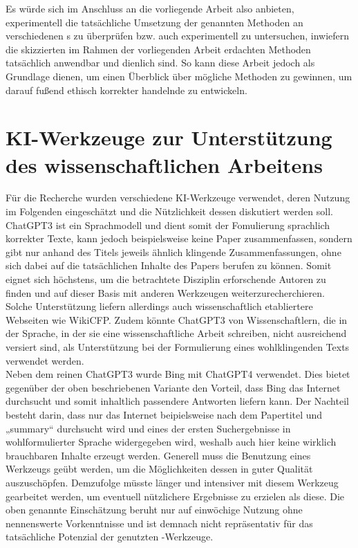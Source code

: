 \documentclass[hidelinks,12pt]{report}
\begin{document}
Es würde sich im Anschluss an die vorliegende Arbeit also anbieten, experimentell die tatsächliche Umsetzung der genannten Methoden an verschiedenen s zu überprüfen bzw. auch experimentell zu untersuchen, inwiefern die skizzierten im Rahmen der vorliegenden Arbeit erdachten Methoden tatsächlich anwendbar und dienlich sind.
So kann diese Arbeit jedoch als Grundlage dienen, um einen Überblick über mögliche Methoden zu gewinnen, um darauf fußend ethisch korrekter handelnde  zu entwickeln.


\chapter{KI-Werkzeuge zur Unterstützung des wissenschaftlichen Arbeitens}
Für die Recherche wurden verschiedene KI-Werkzeuge verwendet, deren Nutzung im Folgenden eingeschätzt und die Nützlichkeit dessen diskutiert werden soll. 
ChatGPT3 ist ein Sprachmodell und dient somit der Fomulierung sprachlich korrekter Texte, kann jedoch beispielsweise keine Paper zusammenfassen, sondern gibt nur anhand des Titels jeweils ähnlich klingende Zusammenfassungen, ohne sich dabei auf die tatsächlichen Inhalte des Papers berufen zu können. Somit eignet sich höchstens, um die betrachtete Disziplin erforschende Autoren zu finden und auf dieser Basis mit anderen Werkzeugen weiterzurecherchieren. Solche Unterstützung liefern allerdings auch wissenschaftlich etabliertere Webseiten wie WikiCFP. Zudem könnte ChatGPT3 von Wissenschaftlern, die in der Sprache, in der sie eine wissenschaftliche Arbeit schreiben, nicht ausreichend versiert sind, als Unterstützung bei der Formulierung eines wohlklingenden Texts verwendet werden.\\

Neben dem reinen ChatGPT3 wurde Bing mit ChatGPT4 verwendet. Dies bietet gegenüber der oben beschriebenen Variante den Vorteil, dass Bing das Internet durchsucht und somit inhaltlich passendere Antworten liefern kann. Der Nachteil besteht darin, dass nur das Internet beipielsweise nach dem Papertitel und „summary“ durchsucht wird und eines der ersten Suchergebnisse in wohlformulierter Sprache widergegeben wird, weshalb auch hier keine wirklich brauchbaren Inhalte erzeugt werden.
Generell muss die Benutzung eines Werkzeugs geübt werden, um die Möglichkeiten dessen in guter Qualität auszuschöpfen. Demzufolge  müsste länger und intensiver mit diesem Werkzeug gearbeitet werden, um eventuell nützlichere Ergebnisse zu erzielen als diese. Die oben genannte Einschätzung beruht nur auf einwöchige Nutzung ohne nennenswerte Vorkenntnisse und ist demnach nicht repräsentativ für das tatsächliche Potenzial der genutzten -Werkzeuge.\\
\end{document}
